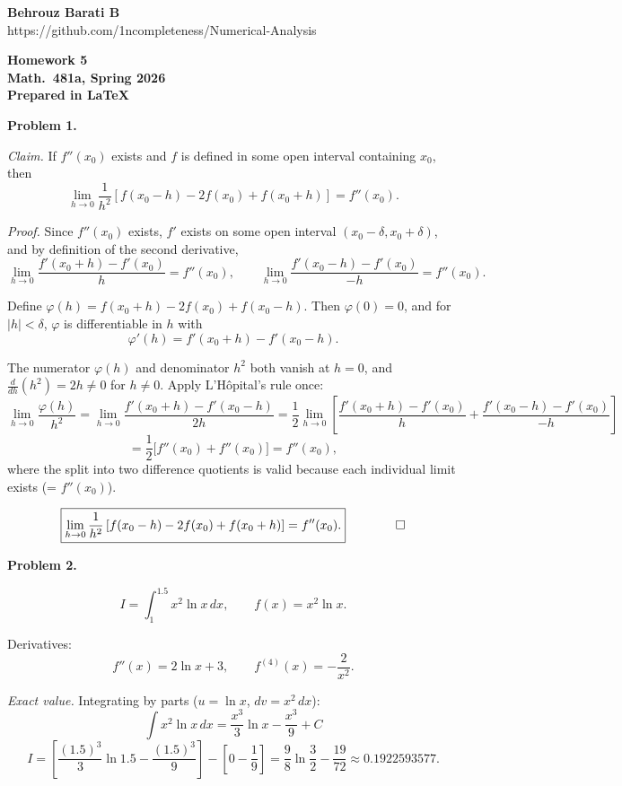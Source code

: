 \documentclass[12pt,letterpaper]{article}
\begin{document}
\par
{\bfseries Behrouz Barati B} \\
https://github.com/1ncompleteness/Numerical-Analysis
\par
\begin{center}
\bfseries Homework 5 \\
\bfseries Math.~481a, Spring 2026 \\
\bfseries Prepared in \LaTeX\
\end{center}


\textbf{Problem 1.}

\textit{Claim.} If $f''(x_0)$ exists and $f$ is defined in some open interval containing $x_0$, then
\[
\lim_{h \to 0} \frac{1}{h^2}\left[f(x_0 - h) - 2f(x_0) + f(x_0 + h)\right] = f''(x_0).
\]

\textit{Proof.} Since $f''(x_0)$ exists, $f'$ exists on some open interval $(x_0 - \delta, x_0 + \delta)$, and by definition of the second derivative,
\[
\lim_{h \to 0} \frac{f'(x_0 + h) - f'(x_0)}{h} = f''(x_0), \qquad \lim_{h \to 0} \frac{f'(x_0 - h) - f'(x_0)}{-h} = f''(x_0).
\]

Define $\varphi(h) = f(x_0 + h) - 2 f(x_0) + f(x_0 - h)$. Then $\varphi(0) = 0$, and for $|h| < \delta$, $\varphi$ is differentiable in $h$ with
\[
\varphi'(h) = f'(x_0 + h) - f'(x_0 - h).
\]

The numerator $\varphi(h)$ and denominator $h^2$ both vanish at $h = 0$, and $\frac{d}{dh}(h^2) = 2h \ne 0$ for $h \ne 0$. Apply L'H\^opital's rule once:
\[
\lim_{h \to 0} \frac{\varphi(h)}{h^2}
= \lim_{h \to 0} \frac{f'(x_0 + h) - f'(x_0 - h)}{2h}
= \frac{1}{2}\lim_{h \to 0}\!\left[\frac{f'(x_0+h) - f'(x_0)}{h} + \frac{f'(x_0-h) - f'(x_0)}{-h}\right]
\]
\[
= \frac{1}{2}\bigl[f''(x_0) + f''(x_0)\bigr] = f''(x_0),
\]
where the split into two difference quotients is valid because each individual limit exists (= $f''(x_0)$).

\[
\boxed{\lim_{h \to 0} \frac{1}{h^2}\left[f(x_0 - h) - 2f(x_0) + f(x_0 + h)\right] = f''(x_0).} \qquad \qed
\]



\textbf{Problem 2.}

\[
I = \int_1^{1.5} x^2 \ln x\,dx, \qquad f(x) = x^2 \ln x.
\]

Derivatives:
\[
f''(x) = 2\ln x + 3, \qquad f^{(4)}(x) = -\frac{2}{x^2}.
\]

\textit{Exact value.} Integrating by parts ($u = \ln x$, $dv = x^2\,dx$):
\[
\int x^2 \ln x\,dx = \frac{x^3}{3}\ln x - \frac{x^3}{9} + C
\]
\[
I = \left[\frac{(1.5)^3}{3}\ln 1.5 - \frac{(1.5)^3}{9}\right] - \left[0 - \frac{1}{9}\right]
= \frac{9}{8}\ln\!\frac{3}{2} - \frac{19}{72} \approx 0.1922593577.
\]
\end{document}
